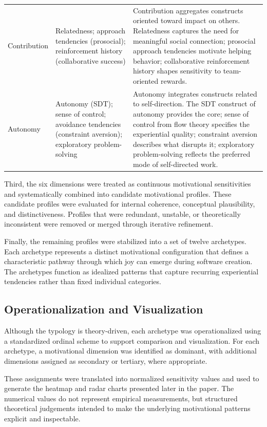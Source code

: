 \documentclass[12pt]{elsarticle}
\begin{document}
\begin{table}[t]
\begin{tabularx}{\linewidth}{l l X}
Contribution & 
Relatedness; approach tendencies (prosocial); reinforcement history (collaborative success) &
Contribution aggregates constructs oriented toward impact on others. Relatedness captures the need for meaningful social connection; prosocial approach tendencies motivate helping behavior; collaborative reinforcement history shapes sensitivity to team-oriented rewards. \\[3pt]

Autonomy & 
Autonomy (SDT); sense of control; avoidance tendencies (constraint aversion); exploratory problem-solving &
Autonomy integrates constructs related to self-direction. The SDT construct of autonomy provides the core; sense of control from flow theory specifies the experiential quality; constraint aversion describes what disrupts it; exploratory problem-solving reflects the preferred mode of self-directed work. \\
\bottomrule
\end{tabularx}
\end{table}

Third, the six dimensions were treated as continuous motivational sensitivities and systematically combined into candidate motivational profiles. These candidate profiles were evaluated for internal coherence, conceptual plausibility, and distinctiveness. Profiles that were redundant, unstable, or theoretically inconsistent were removed or merged through iterative refinement.

Finally, the remaining profiles were stabilized into a set of twelve archetypes. Each archetype represents a distinct motivational configuration that defines a characteristic pathway through which joy can emerge during software creation. The archetypes function as idealized patterns that capture recurring experiential tendencies rather than fixed individual categories.

\subsection{Operationalization and Visualization}

Although the typology is theory-driven, each archetype was operationalized using a standardized ordinal scheme to support comparison and visualization. For each archetype, a motivational dimension was identified as dominant, with additional dimensions assigned as secondary or tertiary, where appropriate.

These assignments were translated into normalized sensitivity values and used to generate the heatmap and radar charts presented later in the paper. The numerical values do not represent empirical measurements, but structured theoretical judgements intended to make the underlying motivational patterns explicit and inspectable.
\end{document}

